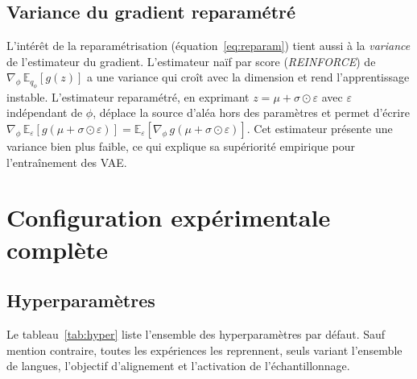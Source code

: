 \documentclass[12pt,a4paper,oneside]{report}
\theoremstyle{definition}
\theoremstyle{plain}
\newcommand{\E}{\mathbb{E}}
\begin{document}
\section{Variance du gradient reparamétré}
\label{app:reparam}

L'intérêt de la reparamétrisation (équation~\eqref{eq:reparam}) tient aussi à la
\emph{variance} de l'estimateur du gradient. L'estimateur naïf par score
(\emph{REINFORCE}) de $\nabla_\phi\,\E_{q_\phi}[g(z)]$ a une variance qui croît avec
la dimension et rend l'apprentissage instable. L'estimateur reparamétré, en
exprimant $z=\mu+\sigma\odot\varepsilon$ avec $\varepsilon$ indépendant de $\phi$,
déplace la source d'aléa hors des paramètres et permet d'écrire
$\nabla_\phi\,\E_\varepsilon[g(\mu+\sigma\odot\varepsilon)] =
\E_\varepsilon[\nabla_\phi\,g(\mu+\sigma\odot\varepsilon)]$. Cet estimateur présente
une variance bien plus faible, ce qui explique sa supériorité empirique pour
l'entraînement des VAE.

\chapter{Configuration expérimentale complète}
\label{app:config}

\section{Hyperparamètres}
Le tableau~\ref{tab:hyper} liste l'ensemble des hyperparamètres par défaut. Sauf
mention contraire, toutes les expériences les reprennent, seuls variant l'ensemble
de langues, l'objectif d'alignement et l'activation de l'échantillonnage.
\end{document}
